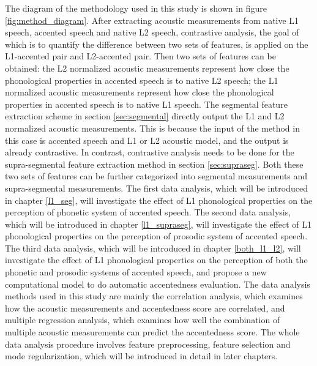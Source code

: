 The diagram of the methodology used in this study is shown in figure \ref{fig:method_diagram}. After extracting acoustic measurements from native L1 speech, accented speech and native L2 speech, contrastive analysis, the goal of which is to quantify the difference between two sets of features, is applied on the L1-accented pair and L2-accented pair. Then two sets of features can be obtained: the L2 normalized acoustic measurements represent how close the phonological properties in accented speech is to native L2 speech; the L1 normalized acoustic measurements represent how close the phonological properties in accented speech is to native L1 speech. The segmental feature extraction scheme in section \ref{sec:segmental} directly output the L1 and L2 normalized acoustic measurements. This is because the input of the method in this case is accented speech and L1 or L2 acoustic model, and the output is already contrastive. In contrast, contrastive analysis needs to be done for the supra-segmental feature extraction method in section \ref{sec:supraseg}. Both these two sets of features can be further categorized into segmental measurements and supra-segmental measurements. The first data analysis, which will be introduced in chapter \ref{l1_seg}, will investigate the effect of L1 phonological properties on the perception of phonetic system of accented speech.  The second data analysis, which will be introduced in chapter \ref{l1_supraseg}, will investigate the effect of L1 phonological properties on the perception of prosodic system of accented speech. The third data analysis, which will be introduced in chapter \ref{both_l1_l2}, will investigate the effect of L1 phonological properties on the perception of both the phonetic and prosodic systems of accented speech, and propose a new computational model to do automatic accentedness evaluation. The data analysis methods used in this study are mainly the correlation analysis, which examines how the acoustic measurements and accentedness score are correlated, and multiple regression analysis, which examines how well the combination of multiple acoustic measurements can predict the accentedness score. The whole data analysis procedure involves feature preprocessing, feature selection and mode regularization, which will be introduced in detail in later chapters.
